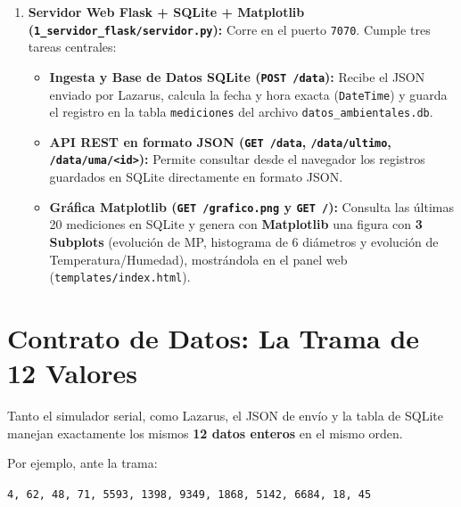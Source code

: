 \documentclass[11pt,a4paper]{article}
\begin{document}
\begin{enumerate}[leftmargin=1.5em]
    \item \textbf{Servidor Web Flask + SQLite + Matplotlib (\texttt{1\_servidor\_flask/servidor.py}):}
    Corre en el puerto \texttt{7070}. Cumple tres tareas centrales:
    \begin{itemize}
        \item \textbf{Ingesta y Base de Datos SQLite (\texttt{POST /data}):} Recibe el JSON enviado por Lazarus, calcula la fecha y hora exacta (\texttt{DateTime}) y guarda el registro en la tabla \texttt{mediciones} del archivo \texttt{datos\_ambientales.db}.
        \item \textbf{API REST en formato JSON (\texttt{GET /data}, \texttt{/data/ultimo}, \texttt{/data/uma/<id>}):} Permite consultar desde el navegador los registros guardados en SQLite directamente en formato JSON.
        \item \textbf{Gráfica Matplotlib (\texttt{GET /grafico.png} y \texttt{GET /}):} Consulta las últimas 20 mediciones en SQLite y genera con \textbf{Matplotlib} una figura con \textbf{3 Subplots} (evolución de MP, histograma de 6 diámetros y evolución de Temperatura/Humedad), mostrándola en el panel web (\texttt{templates/index.html}).
    \end{itemize}
\end{enumerate}

\section{Contrato de Datos: La Trama de 12 Valores}

Tanto el simulador serial, como Lazarus, el JSON de envío y la tabla de SQLite manejan exactamente los mismos \textbf{12 datos enteros} en el mismo orden.

Por ejemplo, ante la trama:
\begin{center}
\texttt{4, 62, 48, 71, 5593, 1398, 9349, 1868, 5142, 6684, 18, 45}
\end{center}
\end{document}
